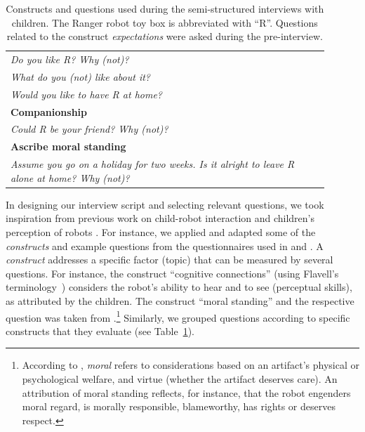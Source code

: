 \documentclass{sig-alternate}
\begin{document}
\begin{table}[h]
\begin{tabular}{p{0.9\linewidth}}
    \emph{Do you like R? Why (not)?} \\
    \emph{What do you (not) like about it?} \\
    \emph{Would you like to have R at home?} \\

    \toprule
    \textbf{Companionship} \\
    \midrule


    \emph{Could R be your friend? Why (not)?}\\

    \toprule
    \textbf{Ascribe moral standing} \\
    \midrule


    \emph{Assume you go on a holiday for two weeks. Is it alright to leave R
    alone at home? Why (not)?} \\

    \bottomrule

\end{tabular}

    \caption{\small Constructs and questions used during the semi-structured interviews
    with children. The Ranger robot toy box is abbreviated with ``R''. Questions
    related to the construct \emph{expectations} were asked during the
    pre-interview.}

    \label{tab:domino-questions} 

\end{table}

In designing our interview script and selecting relevant questions, we took
inspiration from previous work on child-robot interaction and children's
perception of robots
\cite{kahn_jr._robotic_2006,weiss_i_2009,leite_influence_2013}. For instance, we
applied and adapted some of the \emph{constructs} and example questions from the
questionnaires used in \cite{kahn_jr._robotic_2006} and \cite{weiss_i_2009}. A
\emph{construct} addresses a specific factor (topic) that can be measured by
several questions. For instance, the construct ``cognitive connections'' (using
Flavell's terminology~\cite{flavell1988development}) considers the robot's
ability to hear and to see (perceptual skills), as attributed by the children.
The construct ``moral standing'' and the respective question was taken from
\cite{kahn_jr._robotic_2006}.\footnote{According to
\cite{kahn_jr._robotic_2006}, \textit{moral} refers to considerations based
on an artifact's physical or psychological welfare, and virtue (whether the
artifact deserves care). An attribution of moral standing reflects, for
instance, that the robot engenders moral regard, is morally responsible,
blameworthy, has rights or deserves respect.}			Similarly, we grouped
questions according to specific constructs that they evaluate (see
Table~\ref{tab:domino-questions}).
\end{document}
